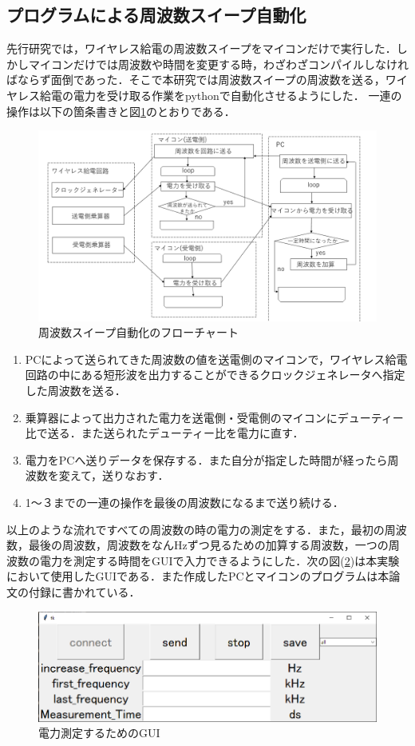 \documentclass[12pt]{jarticle}
\begin{document}
\subsection{プログラムによる周波数スイープ自動化}
先行研究では，ワイヤレス給電の周波数スイープをマイコンだけで実行した．しかしマイコンだけでは周波数や時間を変更する時，わざわざコンパイルしなければならず面倒であった．そこで本研究では周波数スイープの周波数を送る，ワイヤレス給電の電力を受け取る作業をpythonで自動化させるようにした．
	一連の操作は以下の箇条書きと図\ref{fig:zidouka}のとおりである．
 \begin{figure}[H]
	\centering
	\includegraphics[scale=0.4]{huro.png}
	\caption{周波数スイープ自動化のフローチャート}
	\label{fig:zidouka}
\end{figure}
	\begin{enumerate}
		\item PCによって送られてきた周波数の値を送電側のマイコンで，ワイヤレス給電回路の中にある短形波を出力することができるクロックジェネレータへ指定した周波数を送る．
		\item 乗算器によって出力された電力を送電側・受電側のマイコンにデューティー比で送る．また送られたデューティー比を電力に直す．
		\item 電力をPCへ送りデータを保存する．また自分が指定した時間が経ったら周波数を変えて，送りなおす．
		\item 1～３までの一連の操作を最後の周波数になるまで送り続ける．
	\end{enumerate}
	以上のような流れですべての周波数の時の電力の測定をする．また，最初の周波数，最後の周波数，周波数をなんHzずつ見るための加算する周波数，一つの周波数の電力を測定する時間をGUIで入力できるようにした．次の図(\ref{fig:gui})は本実験において使用したGUIである．また作成したPCとマイコンのプログラムは本論文の付録に書かれている．
 \begin{figure}[H]
	\centering
	\includegraphics[scale=0.5]{gui.png}
	\caption{電力測定するためのGUI}
	\label{fig:gui}
\end{figure}
\clearpage
\end{document}
